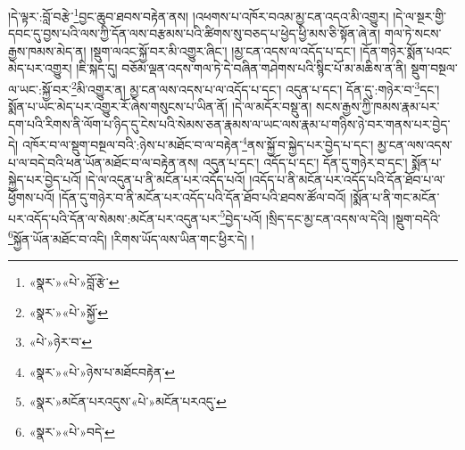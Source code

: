 །དེ་ལྟར་:བློ་བརྩེ་\footnote{«སྣར་»«པེ་»བློ་རྩེ་}བྱང་ཆུབ་ཐབས་བརྟེན་ནས། །འཕགས་པ་འཁོར་བའམ་མྱ་ངན་འདའ་མི་འགྱུར། །དེ་ལ་སྔར་གྱི་དབང་དུ་བྱས་པའི་ལས་ཀྱི་དོན་ལས་བརྩམས་པའི་ཚིགས་སུ་བཅད་པ་ཕྱེད་ཕྱི་མས་ཅི་སྟོན་ཞེ་ན། གལ་ཏེ་སངས་རྒྱས་ཁམས་མེད་ན། །སྡུག་ལའང་སྐྱོ་བར་མི་འགྱུར་ཞིང་། །མྱ་ངན་འདས་ལ་འདོད་པ་དང་། །དོན་གཉེར་སྨོན་པའང་མེད་པར་འགྱུར། །ཇི་སྐད་དུ། བཅོམ་ལྡན་འདས་གལ་ཏེ་དེ་བཞིན་གཤེགས་པའི་སྙིང་པོ་མ་མཆིས་ན་ནི། སྡུག་བསྔལ་ལ་ཡང་:སྐྱོ་བར་\footnote{«སྣར་»«པེ་»སྐྱོ་}མི་འགྱུར་ན། མྱ་ངན་ལས་འདས་པ་ལ་འདོད་པ་དང་། འདུན་པ་དང་། དོན་དུ་:གཉེར་བ་\footnote{«པེ་»ཉེར་བ་}དང་། སྨོན་པ་ཡང་མེད་པར་འགྱུར་རོ་ཞེས་གསུངས་པ་ཡིན་ནོ། །དེ་ལ་མདོར་བསྡུ་ན། སངས་རྒྱས་ཀྱི་ཁམས་རྣམ་པར་དག་པའི་རིགས་ནི་ལོག་པ་ཉིད་དུ་ངེས་པའི་སེམས་ཅན་རྣམས་ལ་ཡང་ལས་རྣམ་པ་གཉིས་ཉེ་བར་གནས་པར་བྱེད་དེ། འཁོར་བ་ལ་སྡུག་བསྔལ་བའི་:ཉེས་པ་མཐོང་བ་ལ་བརྟེན་\footnote{«སྣར་»«པེ་»ཉེས་པ་མཐོངབརྟེན་}ནས་སྐྱོ་བ་སྐྱེད་པར་བྱེད་པ་དང་། མྱ་ངན་ལས་འདས་པ་ལ་བདེ་བའི་ཕན་ཡོན་མཐོང་བ་ལ་བརྟེན་ནས། འདུན་པ་དང་། འདོད་པ་དང་། དོན་དུ་གཉེར་བ་དང་། སྨོན་པ་སྐྱེད་པར་བྱེད་པའོ། །དེ་ལ་འདུན་པ་ནི་མངོན་པར་འདོད་པའོ། །འདོད་པ་ནི་མངོན་པར་འདོད་པའི་དོན་ཐོབ་པ་ལ་ཕྱོགས་པའོ། །དོན་དུ་གཉེར་བ་ནི་མངོན་པར་འདོད་པའི་དོན་ཐོབ་པའི་ཐབས་ཚོལ་བའོ། །སྨོན་པ་ནི་གང་མངོན་པར་འདོད་པའི་དོན་ལ་སེམས་:མངོན་པར་འདུན་པར་\footnote{«སྣར་»མངོན་པརའདུས་«པེ་»མངོན་པརའདུ་}བྱེད་པའོ། །སྲིད་དང་མྱ་ངན་འདས་ལ་དེའི། །སྡུག་བདེའི་\footnote{«སྣར་»«པེ་»བདེ་}སྐྱོན་ཡོན་མཐོང་བ་འདི། །རིགས་ཡོད་ལས་ཡིན་གང་ཕྱིར་དེ། །
